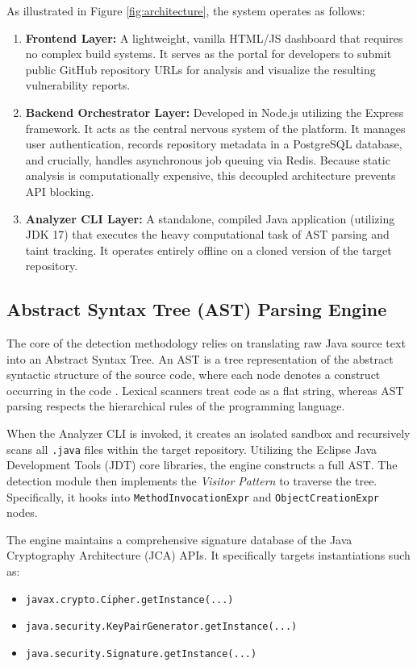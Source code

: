 \documentclass[conference]{IEEEtran}
\begin{document}
As illustrated in Figure \ref{fig:architecture}, the system operates as follows:
\begin{enumerate}
    \item \textbf{Frontend Layer:} A lightweight, vanilla HTML/JS dashboard that requires no complex build systems. It serves as the portal for developers to submit public GitHub repository URLs for analysis and visualize the resulting vulnerability reports.
    \item \textbf{Backend Orchestrator Layer:} Developed in Node.js utilizing the Express framework. It acts as the central nervous system of the platform. It manages user authentication, records repository metadata in a PostgreSQL database, and crucially, handles asynchronous job queuing via Redis. Because static analysis is computationally expensive, this decoupled architecture prevents API blocking.
    \item \textbf{Analyzer CLI Layer:} A standalone, compiled Java application (utilizing JDK 17) that executes the heavy computational task of AST parsing and taint tracking. It operates entirely offline on a cloned version of the target repository.
\end{enumerate}

\subsection{Abstract Syntax Tree (AST) Parsing Engine}
The core of the detection methodology relies on translating raw Java source text into an Abstract Syntax Tree. An AST is a tree representation of the abstract syntactic structure of the source code, where each node denotes a construct occurring in the code \cite{baxter1998}. Lexical scanners treat code as a flat string, whereas AST parsing respects the hierarchical rules of the programming language.

When the Analyzer CLI is invoked, it creates an isolated sandbox and recursively scans all \texttt{.java} files within the target repository. Utilizing the Eclipse Java Development Tools (JDT) core libraries, the engine constructs a full AST. The detection module then implements the \textit{Visitor Pattern} to traverse the tree. Specifically, it hooks into \texttt{MethodInvocationExpr} and \texttt{ObjectCreationExpr} nodes.

The engine maintains a comprehensive signature database of the Java Cryptography Architecture (JCA) APIs. It specifically targets instantiations such as:
\begin{itemize}
    \item \texttt{javax.crypto.Cipher.getInstance(...)}
    \item \texttt{java.security.KeyPairGenerator.getInstance(...)}
    \item \texttt{java.security.Signature.getInstance(...)}
\end{itemize}
\end{document}
